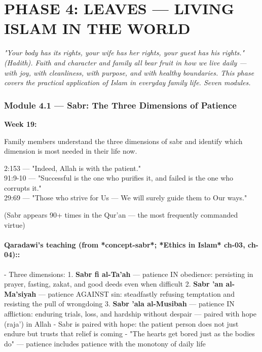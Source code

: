 \documentclass[11pt,a4paper]{article}
\begin{document}
\vspace{6pt}\noindent{\color{border}\rule{\textwidth}{0.5pt}}\vspace{6pt}

\newpage
\section{PHASE 4: LEAVES --- LIVING ISLAM IN THE WORLD}

\begin{quotebox}\itshape "Your body has its rights, your wife has her rights, your guest has his rights." (Hadith). Faith and character and family all bear fruit in how we live daily --- with joy, with cleanliness, with purpose, and with healthy boundaries. This phase covers the practical application of Islam in everyday family life. Seven modules.\end{quotebox}

\subsubsection*{Module 4.1 --- Sabr: The Three Dimensions of Patience}
\textbf{Week 19:} 

\begin{outcomebox} Family members understand the three dimensions of sabr and identify which dimension is most needed in their life now. \end{outcomebox}

\begin{quranbox} 2:153 --- "Indeed, Allah is with the patient." \\ 91:9-10 --- "Successful is the one who purifies it, and failed is the one who corrupts it." \\ 29:69 --- "Those who strive for Us --- We will surely guide them to Our ways." \end{quranbox}

\begin{hadithbox} (Sabr appears 90+ times in the Qur'an --- the most frequently commanded virtue) \end{hadithbox}

\paragraph*{Qaradawi's teaching (from *concept-sabr*; *Ethics in Islam* ch-03, ch-04)::}  - Three dimensions: 1. \textbf{Sabr fi al-Ta'ah} --- patience IN obedience: persisting in prayer, fasting, zakat, and good deeds even when difficult 2. \textbf{Sabr 'an al-Ma'siyah} --- patience AGAINST sin: steadfastly refusing temptation and resisting the pull of wrongdoing 3. \textbf{Sabr 'ala al-Musibah} --- patience IN affliction: enduring trials, loss, and hardship without despair --- paired with hope (raja') in Allah - Sabr is paired with hope: the patient person does not just endure but trusts that relief is coming - "The hearts get bored just as the bodies do" --- patience includes patience with the monotony of daily life
\end{document}
